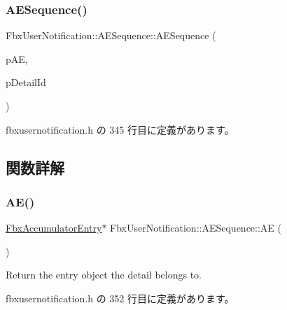 \subsubsection{\texorpdfstring{A\+E\+Sequence()}{AESequence()}}
{\footnotesize\ttfamily Fbx\+User\+Notification\+::\+A\+E\+Sequence\+::\+A\+E\+Sequence (\begin{DoxyParamCaption}\item[{\hyperlink{class_fbx_accumulator_entry}{Fbx\+Accumulator\+Entry} $\ast$}]{p\+AE,  }\item[{int}]{p\+Detail\+Id }\end{DoxyParamCaption})\hspace{0.3cm}{\ttfamily [inline]}}



 fbxusernotification.\+h の 345 行目に定義があります。



\subsection{関数詳解}
\mbox{\label{class_fbx_user_notification_1_1_a_e_sequence_a62caeec18280c5f51f0d44b6a9cab155}} 
\subsubsection{\texorpdfstring{A\+E()}{AE()}}
{\footnotesize\ttfamily \hyperlink{class_fbx_accumulator_entry}{Fbx\+Accumulator\+Entry}$\ast$ Fbx\+User\+Notification\+::\+A\+E\+Sequence\+::\+AE (\begin{DoxyParamCaption}{ }\end{DoxyParamCaption})\hspace{0.3cm}{\ttfamily [inline]}}



Return the entry object the detail belongs to. 



 fbxusernotification.\+h の 352 行目に定義があります。

\mbox{\label{class_fbx_user_notification_1_1_a_e_sequence_ad3052bbb86f4b73424e0f00a52f27218}} 
